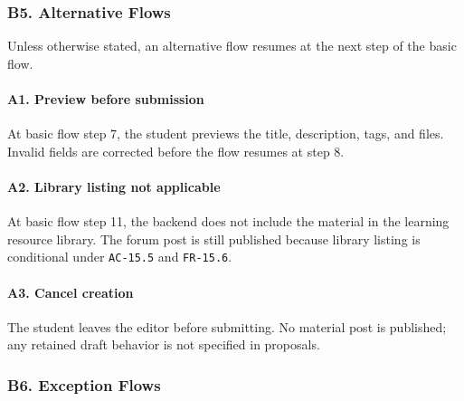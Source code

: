 \documentclass[12pt]{article}
\begin{document}
\hypertarget{sec:b5-alternative-flows}{}
\subsubsection*{B5. Alternative Flows}
\par\medskip

Unless otherwise stated, an alternative flow resumes at the next step of the basic flow.
\par\medskip

\hypertarget{sec:a1-preview-before-submission}{}
\paragraph*{A1. Preview before submission}
\par\medskip

At basic flow step 7, the student previews the title, description, tags, and files. Invalid fields are corrected before the flow resumes at step 8.
\par\medskip

\hypertarget{sec:a2-library-listing-not-applicable}{}
\paragraph*{A2. Library listing not applicable}
\par\medskip

At basic flow step 11, the backend does not include the material in the learning resource library. The forum post is still published because library listing is conditional under \texttt{AC-15.5} and \texttt{FR-15.6}.
\par\medskip

\hypertarget{sec:a3-cancel-creation}{}
\paragraph*{A3. Cancel creation}
\par\medskip

The student leaves the editor before submitting. No material post is published; any retained draft behavior is not specified in proposals.
\par\medskip

\hypertarget{sec:b6-exception-flows}{}
\subsubsection*{B6. Exception Flows}
\par\medskip
\end{document}
